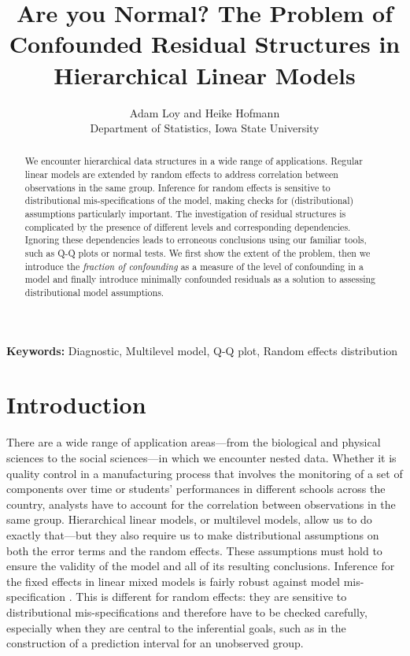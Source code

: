 \documentclass[12pt]{article} %
\title{Are you Normal? The Problem of Confounded Residual Structures in Hierarchical Linear Models}
\author{
	Adam Loy and Heike Hofmann\\
	Department of Statistics,
	Iowa State University
}
\begin{document}
\maketitle


\begin{abstract}
We encounter hierarchical data structures in a wide range of applications. Regular linear models are extended by random effects to address correlation between observations in the same group. Inference for random effects is sensitive to  distributional mis-specifications of the model, making checks for (distributional) assumptions particularly important.  The investigation of residual structures is complicated by the presence of  different levels and corresponding  dependencies. Ignoring these dependencies leads to  erroneous conclusions using our familiar tools, such as Q-Q plots or normal tests. We first show the extent of the problem, then we introduce the {\it fraction of confounding} as a measure of the level of confounding in a model and finally introduce minimally confounded residuals as a solution to assessing distributional model assumptions.
\end{abstract}
{\bf Keywords:} Diagnostic, Multilevel model, Q-Q plot, Random effects distribution


\section{Introduction}\label{sec:intro}
There are a wide range of application areas---from the biological and physical sciences to the social sciences---in which we encounter nested  data.
Whether it is quality control in a manufacturing process that involves the monitoring of a set of components over  time  or students' performances in different schools across the country, analysts have to account for  the correlation between observations in the same group.  Hierarchical linear models, or multilevel models, allow us to do exactly that---but they also require us to make distributional assumptions on both the error terms and the random effects. These assumptions must hold to ensure the validity of the model and all of its resulting conclusions. 
Inference for the fixed effects in linear mixed models is fairly robust against model mis-specification \citep{Butler:1992tx, Verbeke:1997tf}. This is different for random effects: they are sensitive to  distributional mis-specifications and  therefore have to be checked carefully, especially when they are central to the inferential goals, such as in the construction of a prediction interval for an unobserved group.
\end{document}
